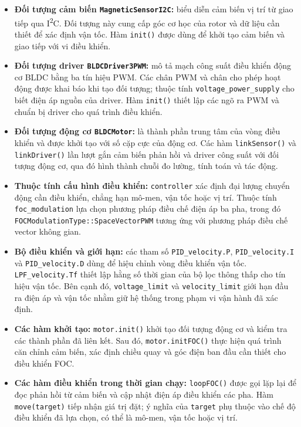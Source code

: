 \begin{itemize}
    \item \textbf{Đối tượng cảm biến \texttt{MagneticSensorI2C}:} biểu diễn cảm biến vị trí từ giao tiếp qua I\textsuperscript{2}C. Đối tượng này cung cấp góc cơ học của rotor và dữ liệu cần thiết để xác định vận tốc. Hàm \texttt{init()} được dùng để khởi tạo cảm biến và giao tiếp với vi điều khiển.

    \item \textbf{Đối tượng driver \texttt{BLDCDriver3PWM}:} mô tả mạch công suất điều khiển động cơ BLDC bằng ba tín hiệu PWM. Các chân PWM và chân cho phép hoạt động được khai báo khi tạo đối tượng; thuộc tính \texttt{voltage\_power\_supply} cho biết điện áp nguồn của driver. Hàm \texttt{init()} thiết lập các ngõ ra PWM và chuẩn bị driver cho quá trình điều khiển.

    \item \textbf{Đối tượng động cơ \texttt{BLDCMotor}:} là thành phần trung tâm của vòng điều khiển và được khởi tạo với số cặp cực của động cơ. Các hàm \texttt{linkSensor()} và \texttt{linkDriver()} lần lượt gắn cảm biến phản hồi và driver công suất với đối tượng động cơ, qua đó hình thành chuỗi đo lường, tính toán và tác động.

    \item \textbf{Thuộc tính cấu hình điều khiển:} \texttt{controller} xác định đại lượng chuyển động cần điều khiển, chẳng hạn mô-men, vận tốc hoặc vị trí. Thuộc tính \texttt{foc\_modulation} lựa chọn phương pháp điều chế điện áp ba pha, trong đó \texttt{FOCModulationType::SpaceVectorPWM} tương ứng với phương pháp điều chế vector không gian.

    \item \textbf{Bộ điều khiển và giới hạn:} các tham số \texttt{PID\_velocity.P}, \texttt{PID\_velocity.I} và \texttt{PID\_velocity.D} dùng để hiệu chỉnh vòng điều khiển vận tốc. \texttt{LPF\_velocity.Tf} thiết lập hằng số thời gian của bộ lọc thông thấp cho tín hiệu vận tốc. Bên cạnh đó, \texttt{voltage\_limit} và \texttt{velocity\_limit} giới hạn đầu ra điện áp và vận tốc nhằm giữ hệ thống trong phạm vi vận hành đã xác định.

    \item \textbf{Các hàm khởi tạo:} \texttt{motor.init()} khởi tạo đối tượng động cơ và kiểm tra các thành phần đã liên kết. Sau đó, \texttt{motor.initFOC()} thực hiện quá trình căn chỉnh cảm biến, xác định chiều quay và góc điện ban đầu cần thiết cho điều khiển FOC.

    \item \textbf{Các hàm điều khiển trong thời gian chạy:} \texttt{loopFOC()} được gọi lặp lại để đọc phản hồi từ cảm biến và cập nhật điện áp điều khiển các pha. Hàm \texttt{move(target)} tiếp nhận giá trị đặt; ý nghĩa của \texttt{target} phụ thuộc vào chế độ điều khiển đã lựa chọn, có thể là mô-men, vận tốc hoặc vị trí.
\end{itemize}

